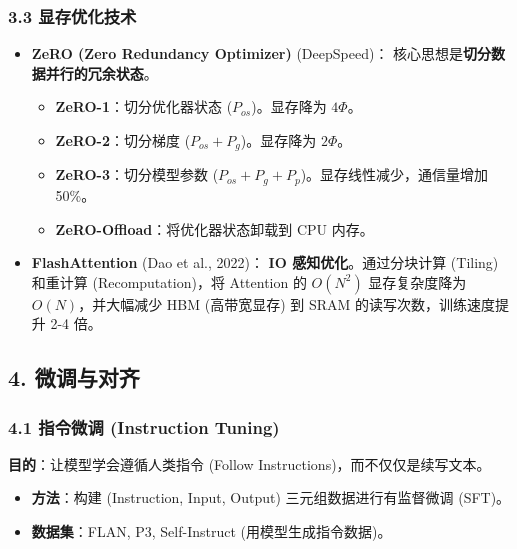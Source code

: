 \documentclass[a4paper, 11pt]{ctexart}
\begin{document}
\subsubsection{3.3 显存优化技术}
\begin{itemize}
    \item \textbf{ZeRO (Zero Redundancy Optimizer)} (DeepSpeed)：
    核心思想是\textbf{切分数据并行的冗余状态}。
    \begin{itemize}
        \item \textbf{ZeRO-1}：切分优化器状态 ($P_{os}$)。显存降为 $4\Phi$。
        \item \textbf{ZeRO-2}：切分梯度 ($P_{os} + P_g$)。显存降为 $2\Phi$。
        \item \textbf{ZeRO-3}：切分模型参数 ($P_{os} + P_g + P_p$)。显存线性减少，通信量增加 50\%。
        \item \textbf{ZeRO-Offload}：将优化器状态卸载到 CPU 内存。
    \end{itemize}
    \item \textbf{FlashAttention} (Dao et al., 2022)：
    \textbf{IO 感知优化}。通过分块计算 (Tiling) 和重计算 (Recomputation)，将 Attention 的 $O(N^2)$ 显存复杂度降为 $O(N)$，并大幅减少 HBM (高带宽显存) 到 SRAM 的读写次数，训练速度提升 2-4 倍。
\end{itemize}

\subsection{4. 微调与对齐}

\subsubsection{4.1 指令微调 (Instruction Tuning)}
\textbf{目的}：让模型学会遵循人类指令 (Follow Instructions)，而不仅仅是续写文本。
\begin{itemize}
    \item \textbf{方法}：构建 (Instruction, Input, Output) 三元组数据进行有监督微调 (SFT)。
    \item \textbf{数据集}：FLAN, P3, Self-Instruct (用模型生成指令数据)。
\end{itemize}
\end{document}
